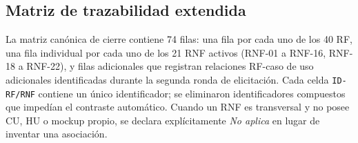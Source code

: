 \documentclass[11pt,a4paper]{article}
\begin{document}
\begin{longtable}{p{} p{} p{} p{} p{} p{} p{} p{}}
		\bottomrule
		
	\end{longtable}
	
	\endgroup
	
	\subsection{Matriz de trazabilidad extendida}
	
	La matriz canónica de cierre contiene 74 filas: una fila por cada uno de los 40 RF, una fila individual por cada uno de los 21 RNF activos (RNF-01 a RNF-16, RNF-18 a RNF-22), y filas adicionales que registran relaciones RF-caso de uso adicionales identificadas durante la segunda ronda de elicitación. Cada celda \texttt{ID-RF/RNF} contiene un único identificador; se eliminaron identificadores compuestos que impedían el contraste automático. Cuando un RNF es transversal y no posee CU, HU o mockup propio, se declara explícitamente \textit{No aplica} en lugar de inventar una asociación.
	
\end{document}
